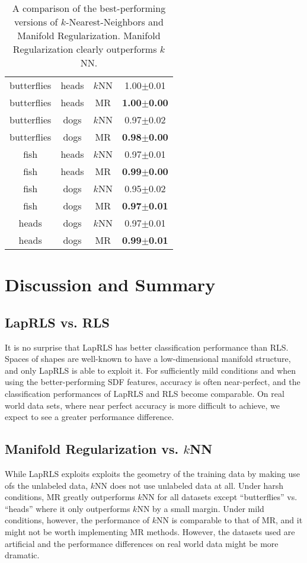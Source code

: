 \documentclass[anon,11pt]{9520} %
\begin{document}
\begin{table}
\begin{center}
\begin{tabular}{|c|c|c|c|}
butterflies&	heads&	$k$NN& 1.00$\pm$0.01\\
butterflies&	heads&		MR& 			\textbf{1.00$\pm$0.00}\\

butterflies&	dogs&	$k$NN& 0.97$\pm$0.02\\
butterflies&	dogs&			MR& 		\textbf{0.98$\pm$0.00}\\\hline

fish&		heads&	$k$NN& 0.97$\pm$0.01\\
fish&	heads&		MR& 			\textbf{0.99$\pm$0.00}\\\hline

fish&		dogs&	$k$NN& 0.95$\pm$0.02\\
fish&	dogs&			MR& 		\textbf{0.97$\pm$0.01}\\\hline

heads&		dogs&	$k$NN& 0.97$\pm$0.01\\
heads&	dogs&		MR& 			\textbf{0.99$\pm$0.01}\\\hline
\end{tabular}
\end{center}
\caption{\label{tbl:knn_vs_mr} A comparison of the best-performing versions of
  $k$-Nearest-Neighbors and Manifold Regularization. Manifold Regularization
  clearly outperforms $k$NN.}
\end{table}

\section{Discussion and Summary}
\subsection{LapRLS vs. RLS}
It is no surprise that LapRLS has better classification performance than
RLS. Spaces of shapes are well-known to have a low-dimensional manifold
structure, and only LapRLS is able to exploit it. For sufficiently mild
conditions and when using the better-performing SDF features, accuracy is often
near-perfect, and the classification performances of LapRLS and RLS become
comparable. On real world data sets, where near perfect accuracy is more
difficult to achieve, we expect to see a greater performance difference.

\subsection{Manifold Regularization vs. $k$NN}
While LapRLS exploits exploits the geometry of the training data by making use
ofs the unlabeled data, $k$NN does not use unlabeled data at all. Under harsh
conditions, MR greatly outperforms $k$NN for all datasets except ``butterflies''
vs. ``heads'' where it only outperforms $k$NN by a small margin. Under mild
conditions, however, the performance of $k$NN is comparable to that of MR, and
it might not be worth implementing MR methods. However, the datasets used are
artificial and the performance differences on real world data might be more
dramatic.
\end{document}
